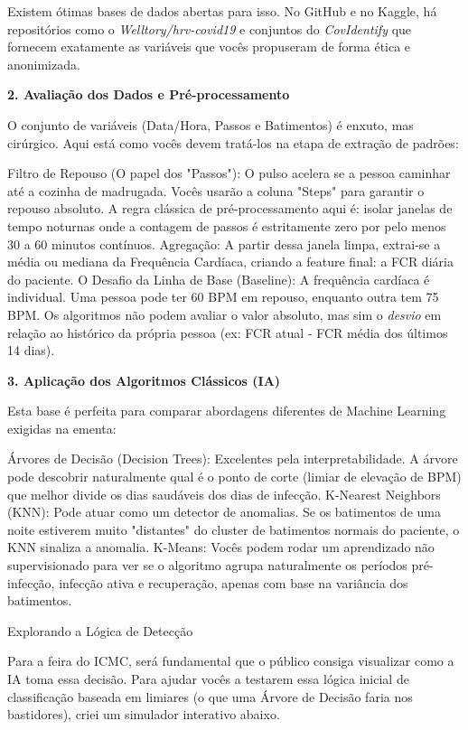 \begin{description}
    Existem ótimas bases de dados abertas para isso. No GitHub e no Kaggle, há repositórios como o \textit{Welltory/hrv-covid19} e conjuntos do \textit{CovIdentify} que fornecem exatamente as variáveis que vocês propuseram de forma ética e anonimizada.

    \textbf{2. Avaliação dos Dados e Pré-processamento}

    O conjunto de variáveis (Data/Hora, Passos e Batimentos) é enxuto, mas cirúrgico. Aqui está como vocês devem tratá-los na etapa de extração de padrões:

    Filtro de Repouso (O papel dos "Passos"): O pulso acelera se a pessoa caminhar até a cozinha de madrugada. Vocês usarão a coluna "Steps" para garantir o repouso absoluto. A regra clássica de pré-processamento aqui é: isolar janelas de tempo noturnas onde a contagem de passos é estritamente zero por pelo menos 30 a 60 minutos contínuos.
    Agregação: A partir dessa janela limpa, extrai-se a média ou mediana da Frequência Cardíaca, criando a feature final: a FCR diária do paciente.
    O Desafio da Linha de Base (Baseline): A frequência cardíaca é individual. Uma pessoa pode ter 60 BPM em repouso, enquanto outra tem 75 BPM. Os algoritmos não podem avaliar o valor absoluto, mas sim o \textit{desvio} em relação ao histórico da própria pessoa (ex: FCR atual - FCR média dos últimos 14 dias).

    \textbf{3. Aplicação dos Algoritmos Clássicos (IA)}

    Esta base é perfeita para comparar abordagens diferentes de Machine Learning exigidas na ementa:

    Árvores de Decisão (Decision Trees): Excelentes pela interpretabilidade. A árvore pode descobrir naturalmente qual é o ponto de corte (limiar de elevação de BPM) que melhor divide os dias saudáveis dos dias de infecção.
    K-Nearest Neighbors (KNN): Pode atuar como um detector de anomalias. Se os batimentos de uma noite estiverem muito "distantes" do cluster de batimentos normais do paciente, o KNN sinaliza a anomalia.
    K-Means: Vocês podem rodar um aprendizado não supervisionado para ver se o algoritmo agrupa naturalmente os períodos pré-infecção, infecção ativa e recuperação, apenas com base na variância dos batimentos.

    Explorando a Lógica de Detecção

    Para a feira do ICMC, será fundamental que o público consiga visualizar como a IA toma essa decisão. Para ajudar vocês a testarem essa lógica inicial de classificação baseada em limiares (o que uma Árvore de Decisão faria nos bastidores), criei um simulador interativo abaixo.


\end{description}
